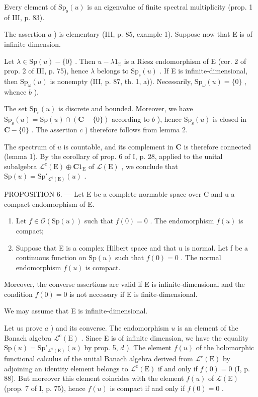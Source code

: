 Every element of \(\mathrm{Sp}_{\mathrm{s}}(u)\) is an eigenvalue of finite spectral multiplicity (prop. 1 of III, p. 83).

The assertion \(a\) ) is elementary (III, p. 85, example 1). Suppose now that E is of infinite dimension.

Let \(\lambda \in \mathrm{Sp}(u) - \{0\}\) . Then \(u - \lambda 1_{\mathrm{E}}\) is a Riesz endomorphism of E (cor. 2 of prop. 2 of III, p. 75), hence \(\lambda\) belongs to \(\mathrm{Sp}_{\mathrm{s}}(u)\) . If E is infinite-dimensional, then \(\mathrm{Sp}_{\omega}(u)\) is nonempty (III, p. 87, th. 1, a)). Necessarily, \(\mathrm{Sp}_{\omega}(u) = \{0\}\) , whence \(b\) ).

The set \(\mathrm{Sp}_{\mathrm{s}}(u)\) is discrete and bounded. Moreover, we have \(\mathrm{Sp}_{\mathrm{s}}(u) = \mathrm{Sp}(u) \cap (\mathbf{C} - \{0\})\) according to \(b\) ), hence \(\mathrm{Sp}_{\mathrm{s}}(u)\) is closed in \(\mathbf{C} - \{0\}\) . The assertion \(c\) ) therefore follows from lemma 2.

The spectrum of \(u\) is countable, and its complement in \(\mathbf{C}\) is therefore connected (lemma 1). By the corollary of prop. 6 of I, p. 28, applied to the unital subalgebra \(\mathcal{L}^{\mathrm{c}}(\mathrm{E})\oplus \mathbf{C}1_{\mathrm{E}}\) of \(\mathcal{L}(\mathrm{E})\) , we conclude that \(\mathrm{Sp}(u) = \mathrm{Sp}'_{\mathcal{L}^{\mathrm{c}}(\mathrm{E})}(u)\) .

PROPOSITION 6. --- Let E be a complete normable space over C and u a compact endomorphism of E.

\begin{enumerate}
\def\labelenumi{\alph{enumi})}
\item
  Let \(f \in \mathcal{O}(\mathrm{Sp}(u))\) such that \(f(0) = 0\) . The endomorphism \(f(u)\) is compact;
\item
  Suppose that E is a complex Hilbert space and that u is normal. Let f be a continuous function on \(\mathrm{Sp}(u)\) such that \(f(0)=0\) . The normal endomorphism \(f(u)\) is compact.
\end{enumerate}

Moreover, the converse assertions are valid if E is infinite-dimensional and the condition \(f(0) = 0\) is not necessary if E is finite-dimensional.

We may assume that E is infinite-dimensional.

Let us prove \(a\) ) and its converse. The endomorphism \(u\) is an element of the Banach algebra \(\mathcal{L}^{\mathrm{c}}(\mathrm{E})\) . Since E is of infinite dimension, we have the equality \(\mathrm{Sp}(u) = \mathrm{Sp}'_{\mathcal{L}^{\mathrm{c}}(\mathrm{E})}(u)\) by prop. 5, \(d\) ). The element \(f(u)\) of the holomorphic functional calculus of the unital Banach algebra derived from \(\mathcal{L}^{\mathrm{c}}(\mathrm{E})\) by adjoining an identity element belongs to \(\mathcal{L}^{\mathrm{c}}(\mathrm{E})\) if and only if \(f(0) = 0\) (I, p. 88). But moreover this element coincides with the element \(f(u)\) of \(\mathcal{L}(\mathrm{E})\) (prop. 7 of I, p. 75), hence \(f(u)\) is compact if and only if \(f(0) = 0\) .

